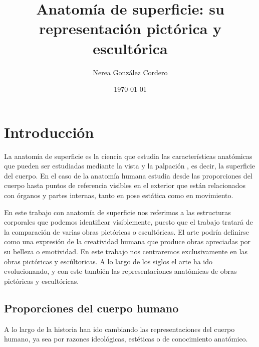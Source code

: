\documentclass[a4paper,12pt]{article} %
\begin{document}
\title{Anatomía de superficie: su representación pictórica y escultórica}
\author{Nerea González Cordero}
\date{\today}
\maketitle %
\thispagestyle{empty} %
\newpage %

\tableofcontents %
\thispagestyle{empty}
\newpage
{} %

\section{Introducción} %

La anatomía de superficie es la ciencia que estudia las características anatómicas que pueden ser estudiadas mediante la vista y la palpación%
, es decir, la superficie del cuerpo. En el caso de la anatomía humana estudia desde las proporciones del cuerpo hasta puntos de referencia visibles en el exterior que están relacionados con órganos y partes internas, tanto en pose estática como en movimiento. %

En este trabajo con anatomía de superficie nos referimos a las estructuras corporales que podemos identificar visiblemente, puesto que el trabajo tratará de la comparación de varias obras pictóricas o escultóricas.
El arte podría definirse como una expresión de la creatividad humana que produce obras apreciadas por su belleza o emotividad. %
En este trabajo nos centraremos exclusivamente en las obras pictóricas y escúltoricas.
A lo largo de los siglos el arte ha ido evolucionando, y con este también las representaciones anatómicas de obras pictóricas y escultóricas.

\subsection{Proporciones del cuerpo humano}
A lo largo de la historia han ido cambiando las representaciones del cuerpo humano, ya sea por razones ideológicas, estéticas o de conocimiento anatómico.
\end{document}
